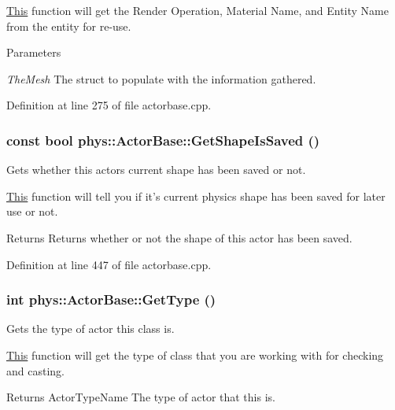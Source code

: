 \hyperlink{structThis}{This} function will get the Render Operation, Material Name, and Entity Name from the entity for re-\/use. 
\begin{DoxyParams}{Parameters}
\item[{\em TheMesh}]The struct to populate with the information gathered. \end{DoxyParams}


Definition at line 275 of file actorbase.cpp.

\hypertarget{classphys_1_1ActorBase_ace1d04b4fbb21823cde3feee83d17c2f}{
\subsubsection[{GetShapeIsSaved}]{\setlength{\rightskip}{0pt plus 5cm}const bool phys::ActorBase::GetShapeIsSaved ()}}
\label{d8/d0f/classphys_1_1ActorBase_ace1d04b4fbb21823cde3feee83d17c2f}


Gets whether this actors current shape has been saved or not. 

\hyperlink{structThis}{This} function will tell you if it's current physics shape has been saved for later use or not. \begin{DoxyReturn}{Returns}
Returns whether or not the shape of this actor has been saved. 
\end{DoxyReturn}


Definition at line 447 of file actorbase.cpp.

\hypertarget{classphys_1_1ActorBase_ab8bedea2ef0ce9194731ebeb886333ff}{
\subsubsection[{GetType}]{\setlength{\rightskip}{0pt plus 5cm}int phys::ActorBase::GetType ()}}
\label{d8/d0f/classphys_1_1ActorBase_ab8bedea2ef0ce9194731ebeb886333ff}


Gets the type of actor this class is. 

\hyperlink{structThis}{This} function will get the type of class that you are working with for checking and casting. \begin{DoxyReturn}{Returns}
ActorTypeName The type of actor that this is. 
\end{DoxyReturn}


